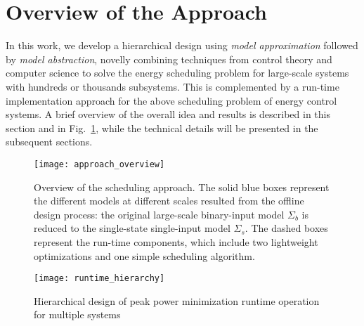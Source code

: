 \section{Overview of the Approach}
\label{sec:overview}

In this work, we develop a hierarchical design using \emph{model approximation} followed by \emph{model abstraction}, novelly combining techniques from control theory and computer science to solve the energy scheduling problem for large-scale systems with hundreds or thousands subsystems. This is complemented by a run-time implementation approach for the above scheduling problem of energy control systems.
A brief overview of the overall idea and results is described in this section and in Fig.~\ref{fig:overview}, while the technical details will be presented in the subsequent sections.

\begin{figure}[tb]
  \centering
  \texttt{[image: approach\_overview]}
  \caption{Overview of the scheduling approach. The solid blue boxes represent the different models at different scales resulted from the offline design process: the original large-scale binary-input model $\Sigma_{b}$ is reduced to the single-state single-input model $\Sigma_{s}$.  The dashed boxes represent the run-time components, which include two lightweight optimizations and one simple scheduling algorithm.}
  \vspace{-10pt}
  \label{fig:overview}
\end{figure}

\begin{figure}[tb]
  \centering
  \texttt{[image: runtime\_hierarchy]}
  \caption{Hierarchical design of peak power minimization runtime operation for multiple systems}
    \vspace{-10pt}
  \label{fig:runtime-hierarchy}
\end{figure}


